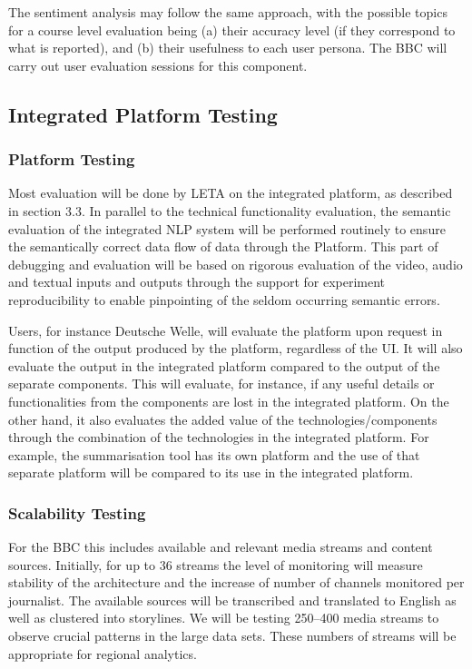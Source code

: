 The sentiment analysis may follow the same approach, with the possible topics for a course level evaluation being (a) their accuracy level (if they correspond to what is reported), and (b) their usefulness to each user persona.
The BBC will carry out user evaluation sessions for this component.


\subsection{Integrated Platform Testing}



\subsubsection{Platform Testing}

Most evaluation will be done by LETA on the integrated platform, as described in section 3.3. In parallel to the technical functionality evaluation, the semantic evaluation of the integrated NLP system will be performed routinely to ensure the semantically correct data flow of data through the \SUMMA Platform. This part of debugging and evaluation will be based on rigorous evaluation of the video, audio and textual inputs and outputs through the support for experiment reproducibility to enable pinpointing of the seldom occurring semantic errors.

Users, for instance Deutsche Welle, will evaluate the platform upon request in function of the output produced by the platform, regardless of the UI. It will also evaluate the output in the integrated platform compared to the output of the separate components. This will evaluate, for instance, if any useful details or functionalities from the components are lost in the integrated platform. On the other hand, it also evaluates the added value of the technologies/components through the combination of the technologies in the integrated platform. For example, the summarisation tool has its own platform and the use of that separate platform will be compared to its use in the integrated platform.

\subsubsection{Scalability Testing}

For the BBC this includes available and relevant media streams and content sources. Initially, for up to 36 streams the level of monitoring will measure stability of the architecture and the increase of number of channels monitored per journalist. The available sources will be transcribed and translated to English as well as clustered into storylines. We will be testing 250–400 media 
streams to observe crucial patterns in the large data sets. These numbers of streams will be appropriate for regional analytics.

